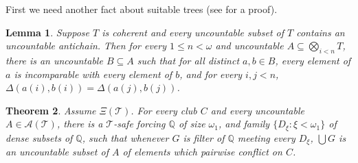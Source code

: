 \documentclass[a4paper,noamsfonts]{amsart}
\newtheorem{theorem}{Theorem}[section]
\newtheorem{lemma}[theorem]{Lemma}
\theoremstyle{definition}
\newcommand{\Q}{\mathbb{Q}}
\newcommand{\seb}{\subseteq}
\newcommand{\1}{\mathbbm{1}}
\newcommand{\T}{\mathcal{T}}
\newcommand{\prop}{\Xi}
\begin{document}
First we need another fact about suitable trees
(see \cite{TodorcevicWalks} for a proof).

\begin{lemma}\label{lem:tuples}
  Suppose $T$ is coherent and every uncountable subset of $T$
  contains an uncountable antichain. Then for every $1 \le n < \omega$
  and uncountable $A \seb \bigotimes_{i < n}T$, 
  there is an uncountable $B \seb A$
  such that for all distinct $a,b \in B$, every element
  of $a$ is incomparable with every element of $b$, and for every
  $i,j < n$, $\Delta(a(i),b(i)) = \Delta(a(j),b(j))$.
\end{lemma}

\begin{theorem}\label{thm:crux}
  Assume $\prop(\T)$. For every club $C$
  and every uncountable $A \in \mathcal{A}(\T)$,
  there is a $\T$-safe forcing $\Q$ of
  size $\omega_{1}$, and family
  $\{D_{\xi} : \xi < \omega_{1}\}$ of dense subsets of $\Q$,
  such that whenever $G$ is filter of $\Q$ meeting every
  $D_{\xi}$, $\bigcup G$ is an uncountable subset of $A$ of elements which
  pairwise conflict on $C$.
\end{theorem}
\end{document}
